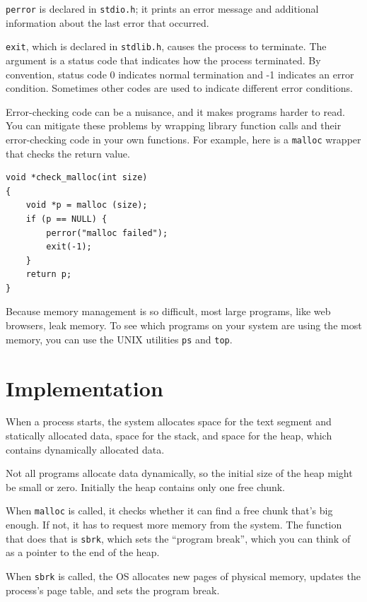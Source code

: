 \documentclass[12pt]{book}
\begin{document}
{{\tt perror} is declared in {\tt stdio.h}; it prints
an error message and additional information about the last error
that occurred.

{\tt exit}, which is declared in {\tt stdlib.h}, causes the process
to terminate.  The argument is a status code that indicates how
the process terminated.  By convention, status code 0 indicates normal
termination and -1 indicates an error condition.  Sometimes other
codes are used to indicate different error conditions.

Error-checking code can be a nuisance, and it makes programs
harder to read.  You can mitigate these problems by wrapping library
function calls and their error-checking code in your own
functions.  For example, here is a {\tt malloc} wrapper that checks
the return value.

\begin{verbatim}
void *check_malloc(int size)
{
    void *p = malloc (size);
    if (p == NULL) {
        perror("malloc failed");
        exit(-1);
    }
    return p;
}
\end{verbatim}

Because memory management is so difficult, most large programs, like
web browsers, leak memory.  To see which programs on your system are
using the most memory, you can use the UNIX utilities {\tt ps} and
{\tt top}.




\section{Implementation}

When a process starts, the system allocates space for the text segment
and statically allocated data, space for the stack, and space for the
heap, which contains dynamically allocated data.

Not all programs allocate data dynamically, so the initial size of the
heap might be small or zero.  Initially the heap contains only one
free chunk.

When {\tt malloc} is called, it checks whether it can find a free
chunk that's big enough.  If not, it has to request more memory
from the system.  The function that does that is {\tt sbrk},
which sets the ``program break'', which you can think of as a pointer
to the end of the heap.

When {\tt sbrk} is called, the OS allocates new pages of physical
memory, updates the process's page table, and sets the program
break.

}
\end{document}
